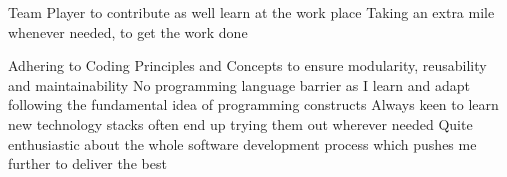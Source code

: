 \begin{cvhonors}
  \cvhonor
    {Team Player}
    {to contribute as well learn at the work place}
    {}
    {}
  \cvhonor
    {Taking an extra mile}
    {whenever needed, to get the work done}
    {}
    {}
\end{cvhonors}
\break
{}
\begin{cvhonors}
  \cvhonor
    {Adhering to Coding Principles and Concepts}
    {to ensure modularity, reusability and maintainability}
    {}
    {}
  \cvhonor
    {No programming language barrier}
    {as I learn and adapt following the fundamental idea of programming constructs}
    {}
    {}
  \cvhonor
    {Always keen to learn new technology stacks}
    {often end up trying them out wherever needed}
    {}
    {}
  \cvhonor
    {Quite enthusiastic about the whole software development process}
    {which pushes me further to deliver the best}
    {}
    {}
\end{cvhonors}